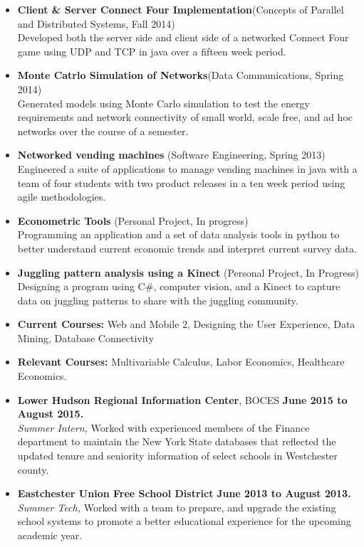\documentclass[10pt]{article}
\begin{document}
\begin{itemize}[topsep=1ex, itemsep=.25ex, partopsep=0ex, parsep=1ex]
    	\item[] {\bf Client \& Server Connect Four Implementation}(Concepts of Parallel and Distributed Systems, Fall 2014)\\
    	Developed both the server side and client side of a networked Connect Four game using UDP and TCP in java over a fifteen week period.
	\item[] {\bf Monte Catrlo Simulation of Networks}(Data Communications, Spring 2014)\\
	Generated models using Monte Carlo simulation to test the energy requirements and network connectivity of small world, scale free, and ad hoc networks over the course of a semester.
	\item[] {\bf Networked vending machines} (Software Engineering, Spring 2013)\\
	Engineered a suite of applications to manage vending machines in java with a team of four students with two product releases in a ten week period using agile methodologies.
	\item[] {\bf Econometric Tools} (Personal Project, In progress)\\
	Programming  an application and a set of data analysis tools in python to better understand current economic trends and interpret current survey data.
	\item[] {\bf Juggling pattern analysis using a Kinect} (Personal Project, In Progress)\\
    	Designing a program using C\#, computer vision, and a Kinect to capture data on juggling patterns to share with the juggling community.
	\item[] {\bf Current Courses:} Web and Mobile 2, Designing the User Experience, Data Mining, Database Connectivity
	\item[] {\bf Relevant Courses:} Multivariable Calculus, Labor Economics, Healthcare Economics.
\end{itemize}
\vspace{1ex}
\begin{itemize} [topsep=1ex, itemsep=.25ex, partopsep=0ex, parsep=1ex]
	\item[]{{\bf Lower Hudson Regional Information Center}, BOCES \hfill {\bf June 2015 to August 2015.}}\\
	{\it Summer Intern,}
	Worked with experienced members of the Finance department to maintain the New York
	State databases that reflected the updated tenure and seniority information of select schools in Westchester county.
	\item[]{{\bf Eastchester Union Free School District} \hfill { \bf June 2013 to August 2013.}}\\
		{\it Summer Tech,}
		{Worked with a team to prepare, and upgrade the existing school systems to promote a better educational experience for the upcoming academic year.}
\end{itemize}
\end{document}
